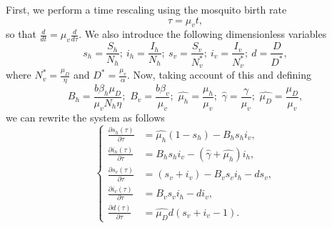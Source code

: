 \documentclass{amsart}
\theoremstyle{definition}
\theoremstyle{remark}
\numberwithin{equation}{section}
\begin{document}
	First, we perform a time rescaling using the mosquito birth rate	
	$$\tau=\mu_v t,$$ so that $\frac{d}{dt} = \mu_v \frac{d}{d\tau}$. We also introduce the following dimensionless variables
	\begin{equation}
		s_h=\frac{S_h}{N_h};\	i_h=\frac{I_h}{N_h};\ 	s_v=\frac{S_v}{N_v^*};\ i_v=\frac{I_v}{N_v^*};\ d=\frac{D}{D^*},
	\end{equation}
	where $N_v^*=\frac{\mu_D}{\eta}$ and $D^*=\frac{\mu_v}{\alpha}$. Now, taking account of this and defining
	$$
	B_h=\frac{b\beta_h\mu_D}{\mu_vN_h\eta};\,\, B_v=\frac{b\beta_v}{\mu_v};\,\, \widehat{\mu_h}=\frac{\mu_h}{\mu_v};\,\, \widehat{\gamma}=\frac{\gamma}{\mu_v};\,\, \widehat{\mu_D}=\frac{\mu_D}{\mu_v},
	$$
	we can rewrite the system as follows
	\begin{equation}
		\label{eq: modelo SILV red}
		\begin{cases}
			\frac{\partial s_h(\tau)}{\partial \tau} & = \widehat{\mu_h}(1-s_h) -B_h s_h i_v,\\
			\frac{\partial i_h(\tau)}{\partial \tau}& = B_h s_h i_v - (\widehat{\gamma}+\widehat{\mu_h}) i_h, \\
			\frac{\partial s_v(\tau)}{\partial \tau} & =  (s_v + i_v) -B_v s_v i_h   - d s_v, \\
			\frac{\partial i_v(\tau)}{\partial \tau} & = B_v s_v i_h - d i_v, \\
			\frac{\partial d(\tau)}{\partial \tau} & =  \widehat{\mu_D} d(s_v + i_v -1 )  .
		\end{cases}
	\end{equation}
	
\end{document}
